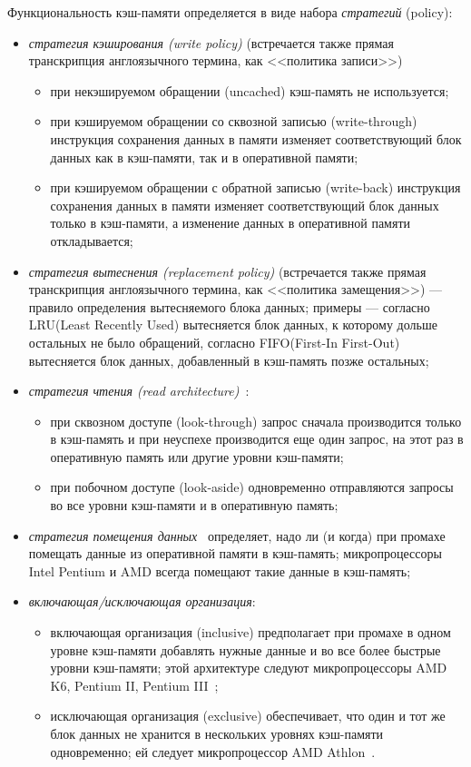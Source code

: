 \documentclass[14pt]{extreport}
\newcommand{\LRU}{\textsf{LRU}\xspace}
\newcommand{\FIFO}{\textsf{FIFO}\xspace}
\begin{document}
Функциональность кэш-памяти определяется в виде набора \emph{стратегий} (policy):
\begin{itemize}
	\item \emph{стратегия кэширования (write policy)} (встречается также прямая транскрипция англоязычного термина, как <<политика записи>>)
		\begin{itemize}
		\item при некэшируемом обращении (uncached) кэш-память не используется;
		\item при кэшируемом обращении со сквозной записью (write-through) инструкция сохранения данных в памяти изменяет соответствующий блок данных как в кэш-памяти, так и в оперативной памяти;
		\item при кэшируемом обращении с обратной записью (write-back) инструкция сохранения данных в памяти изменяет соответствующий блок данных только в кэш-памяти, а изменение данных в оперативной памяти откладывается;
		\end{itemize}
	\item \emph{стратегия вытеснения (replacement policy)} (встречается также прямая транскрипция англоязычного термина, как <<политика замещения>>) --- правило определения вытесняемого блока данных; примеры --- согласно \LRU (Least Recently Used) вытесняется блок данных, к которому дольше остальных не было обращений, согласно \FIFO (First-In First-Out) вытесняется блок данных, добавленный в кэш-память позже остальных;
	\item \emph{стратегия чтения (read architecture)}~\cite{IntelCache}:
		\begin{itemize}
			\item при сквозном доступе (look-through) запрос сначала производится только в кэш-память и при неуспехе производится еще один запрос, на этот раз в оперативную память или другие уровни кэш-памяти;
			\item при побочном доступе (look-aside) одновременно отправляются запросы во все уровни кэш-памяти и в оперативную память;
		\end{itemize}
	\item \emph{стратегия помещения данных}~\cite{Kasperski_EffectiveMemory} определяет, надо ли (и когда) при промахе помещать данные из оперативной памяти в кэш-память; микропроцессоры Intel Pentium и AMD всегда помещают такие данные в кэш-память;
	\item \emph{включающая/исключающая организация}:
		\begin{itemize}
		\item включающая организация (inclusive) предполагает при промахе в одном уровне кэш-памяти добавлять нужные данные и во все более быстрые уровни кэш-памяти; этой архитектуре следуют микропроцессоры AMD K6, Pentium II, Pentium III~\cite{Kasperski_EffectiveMemory};
		\item исключающая организация (exclusive) обеспечивает, что один и тот же блок данных не хранится в нескольких уровнях кэш-памяти одновременно; ей следует микропроцессор AMD Athlon~\cite{Kasperski_EffectiveMemory}.
		\end{itemize}
\end{itemize}
\end{document}
